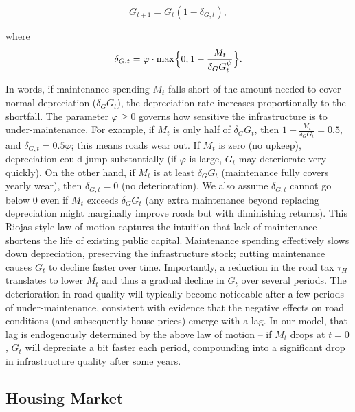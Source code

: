 \begin{equation}
    G_{t+1} = G_t (1 - \delta_{G,t}) ,\label{eq:roads}
\end{equation}

where
\begin{equation}
\delta_{G,t} = \varphi \cdot \max\Bigl\{0,  1 - \frac{M_t}{\delta_G G_{t}^{\psi}} \Bigr\}.
\end{equation}

In words, if maintenance spending $M_t$ falls short of the amount needed to cover normal depreciation ($\delta_G G_t$), the depreciation rate increases proportionally to the shortfall. The parameter $\varphi \ge 0$ governs how sensitive the infrastructure is to under-maintenance. For example, if $M_t$ is only half of $\delta_G G_t$, then $1 - \frac{M_t}{\delta_G G_t} = 0.5$, and $\delta_{G,t} = 0.5\varphi$; this means roads wear out. If $M_t$ is zero (no upkeep), depreciation could jump substantially (if $\varphi$ is large, $G_t$ may deteriorate very quickly). On the other hand, if $M_t$ is at least $\delta_G G_t$ (maintenance fully covers yearly wear), then $\delta_{G,t}=0$ (no deterioration). We also assume $\delta_{G,t}$ cannot go below 0 even if $M_t$ exceeds $\delta_G G_t$ (any extra maintenance beyond replacing depreciation might marginally improve roads but with diminishing returns). This Riojas-style law of motion captures the intuition that lack of maintenance shortens the life of existing public capital. Maintenance spending effectively slows down depreciation, preserving the infrastructure stock; cutting maintenance causes $G_t$ to decline faster over time. Importantly, a reduction in the road tax $\tau_H$ translates to lower $M_t$ and thus a gradual decline in $G_t$ over several periods. The deterioration in road quality will typically become noticeable after a few periods of under-maintenance, consistent with evidence that the negative effects on road conditions (and subsequently house prices) emerge with a lag. In our model, that lag is endogenously determined by the above law of motion – if $M_t$ drops at $t=0$, $G_t$ will depreciate a bit faster each period, compounding into a significant drop in infrastructure quality after some years.

\subsection{Housing Market}

